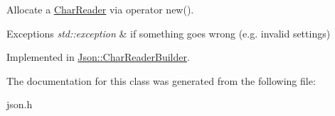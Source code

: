 Allocate a \hyperlink{class_json_1_1_char_reader}{Char\-Reader} via operator new(). 


\begin{DoxyExceptions}{Exceptions}
{\em std\-::exception} & if something goes wrong (e.\-g. invalid settings) \\
\hline
\end{DoxyExceptions}


Implemented in \hyperlink{class_json_1_1_char_reader_builder_a81da7da750111321ff14baf0f0a4c8ae}{Json\-::\-Char\-Reader\-Builder}.



The documentation for this class was generated from the following file\-:\begin{DoxyCompactItemize}
\item 
json.\-h\end{DoxyCompactItemize}
